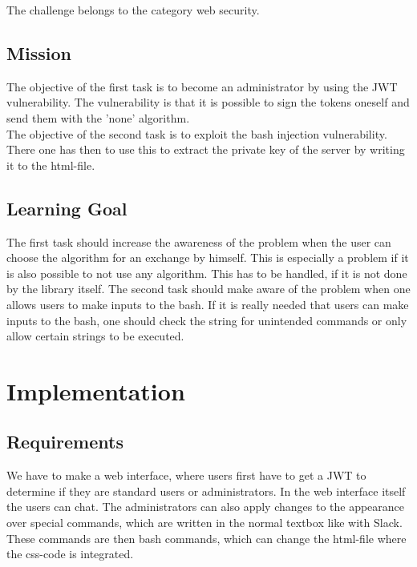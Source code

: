 \documentclass[12pt,a4paper]{article}
\begin{document}
The challenge belongs to the category web security. %
\subsection{Mission}

The objective of the first task is to become an administrator by using the JWT vulnerability. The vulnerability is that it is possible to sign the tokens oneself and send them with the 'none' algorithm.\\
The objective of the second task is to exploit the bash injection vulnerability. There one has then to use this to extract the private key of the server by writing it to the html-file.
\subsection{Learning Goal}

The first task should increase the awareness of the problem when the user can choose the algorithm for an exchange by himself. This is especially a problem if  it is also possible to not use any  algorithm. This has to be handled, if it is not done by the library itself.
The second task should make aware of the problem when one allows users to make inputs to the bash. If it is really needed that users can make inputs to the bash, one should check the string for unintended commands or only allow certain strings to be executed.

\section{Implementation}
\subsection{Requirements}
We have to make a web interface, where users first have to get a JWT to determine if they are standard users or administrators. In the web interface itself the users can chat. The administrators can also apply changes to the appearance over special commands, which are written in the normal textbox like with Slack. These commands are then bash commands, which can change the html-file where the css-code is integrated.
\end{document}
